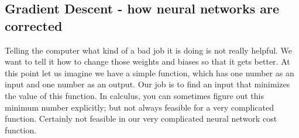 \documentclass[master]{thesis-uestc}
\begin{document}
\subsection*{Gradient Descent - how neural networks are corrected}
Telling the computer what kind of a bad job it is doing is not really helpful. We want to tell it how to change those weights and biases so that it gets better. At this point let us imagine we have a simple function, which has one number as an input and one number as an output. Our job is to find an input that minimizes the value of this function. In calculus, you can sometimes figure out this minimum number explicitly; but not always feasible for a very complicated function. Certainly not feasible in our very complicated neural network cost function. 

\end{document}
